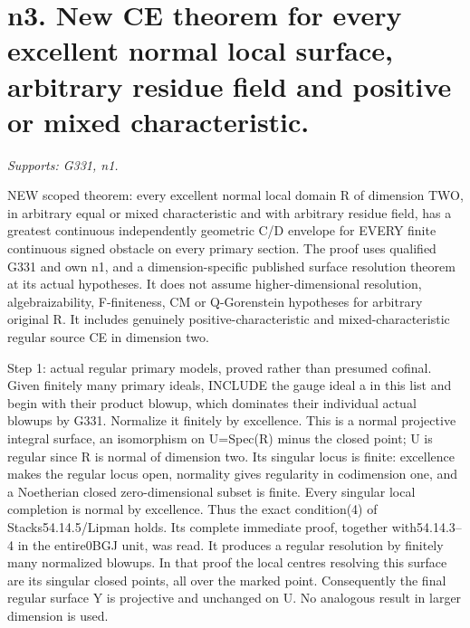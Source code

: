 \section{n3. New CE theorem for every excellent normal local surface, arbitrary residue field and positive or mixed characteristic.}
\textit{Supports: G331, n1.}

NEW scoped theorem: every excellent normal local domain R of dimension TWO, in arbitrary equal or mixed characteristic and with arbitrary residue field, has a greatest continuous independently geometric C/D envelope for EVERY finite continuous signed obstacle on every primary section. The proof uses qualified G331 and own n1, and a dimension-specific published surface resolution theorem at its actual hypotheses. It does not assume higher-dimensional resolution, algebraizability, F-finiteness, CM or Q-Gorenstein hypotheses for arbitrary original R. It includes genuinely positive-characteristic and mixed-characteristic regular source CE in dimension two.

Step 1: actual regular primary models, proved rather than presumed cofinal. Given finitely many primary ideals, INCLUDE the gauge ideal a in this list and begin with their product blowup, which dominates their individual actual blowups by G331. Normalize it finitely by excellence. This is a normal projective integral surface, an isomorphism on U=Spec(R) minus the closed point; U is regular since R is normal of dimension two. Its singular locus is finite: excellence makes the regular locus open, normality gives regularity in codimension one, and a Noetherian closed zero-dimensional subset is finite. Every singular local completion is normal by excellence. Thus the exact condition(4) of Stacks54.14.5/Lipman holds. Its complete immediate proof, together with54.14.3--4 in the entire0BGJ unit, was read. It produces a regular resolution by finitely many normalized blowups. In that proof the local centres resolving this surface are its singular closed points, all over the marked point. Consequently the final regular surface Y is projective and unchanged on U. No analogous result in larger dimension is used.

